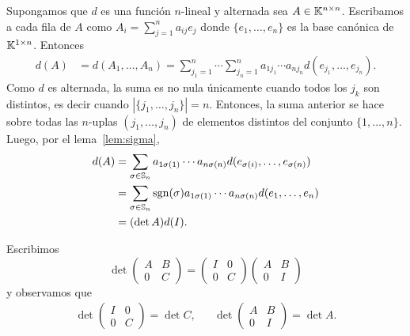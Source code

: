 \begin{solution}[ejercicio~\ref{xca:dA=(detA)dI}]
    Supongamos que $d$ es una función $n$-lineal y alternada sea $A\in\mathbb{K}^{n\times
    n}$. Escribamos a cada fila de $A$ como $A_i=\sum_{j=1}^n a_{ij}e_j$
    donde $\{e_1,\dots,e_n\}$ es la base canónica de $\mathbb{K}^{1\times n}$.
    Entonces
    \begin{align*}
        d(A)&=d(A_1,\dots,A_n)
        =\sum_{j_1=1}^n\cdots\sum_{j_n=1}^na_{1j_1}\cdots a_{nj_n}d(e_{j_1},\dots,e_{j_n}).
    \end{align*}
    Como $d$ es alternada, la suma es no nula únicamente cuando todos los
    $j_k$ son distintos, es decir cuando $|\{j_1,\dots,j_n\}|=n$. Entonces,
    la suma anterior se hace sobre todas las $n$-uplas $(j_1,\dots,j_n)$ de
    elementos distintos del conjunto $\{1,\dots,n\}$. Luego, por el
    lema~\ref{lem:sigma},  
    \begin{align*} 
        d(A)&=\sum_{\sigma\in\mathbb{S}_n}a_{1\sigma(1)}\cdots a_{n\sigma(n)}d(e_{\sigma(i)},\dots,e_{\sigma(n)})\\
        &=\sum_{\sigma\in\mathbb{S}_n}\operatorname{sgn}(\sigma)a_{1\sigma(1)}\cdots a_{n\sigma(n)}d(e_1,\dots,e_n)\\
        &=(\det A)d(I).
    \end{align*}
\end{solution}

\begin{solution}
	Escribimos
	\[
	\det\begin{pmatrix}
		A & B\\
		0 & C
	\end{pmatrix}
	=\begin{pmatrix}
		I & 0\\
		0 & C
	\end{pmatrix}
	\begin{pmatrix}
		A & B\\
		0 & I
	\end{pmatrix}
	\]
	y observamos que 
	\begin{align*}
		\det\begin{pmatrix}
			I & 0\\
			0 & C
		\end{pmatrix}
		=\det C,
		&&
		\det\begin{pmatrix}
			A & B\\
			0 & I
		\end{pmatrix}
		=\det A.
	\end{align*}
\end{solution}

